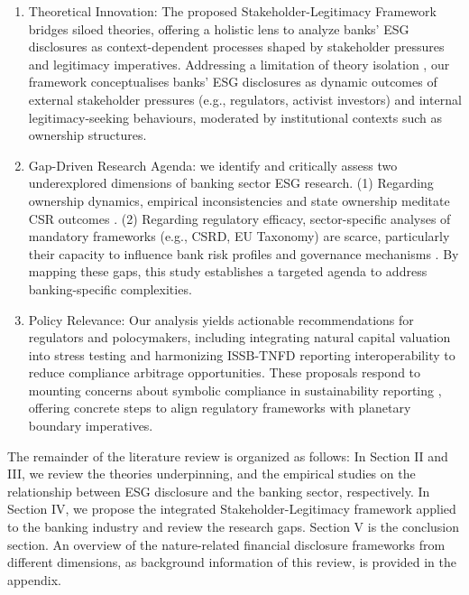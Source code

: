 \documentclass[
  authoryear]{elsarticle}
\begin{document}
\begin{enumerate}
\def\labelenumi{\arabic{enumi}.}
\item
  Theoretical Innovation: The proposed Stakeholder-Legitimacy Framework
  bridges siloed theories, offering a holistic lens to analyze banks'
  ESG disclosures as context-dependent processes shaped by stakeholder
  pressures and legitimacy imperatives. Addressing a limitation of
  theory isolation \citep{ECCLES2012}, our framework conceptualises
  banks' ESG disclosures as dynamic outcomes of external stakeholder
  pressures (e.g., regulators, activist investors) and internal
  legitimacy-seeking behaviours, moderated by institutional contexts
  such as ownership structures.
\item
  Gap-Driven Research Agenda: we identify and critically assess two
  underexplored dimensions of banking sector ESG research. (1) Regarding
  ownership dynamics, empirical inconsistencies and state ownership
  meditate CSR outcomes \citep{DYCK2019, RAIMO2020}. (2) Regarding
  regulatory efficacy, sector-specific analyses of mandatory frameworks
  (e.g., CSRD, EU Taxonomy) are scarce, particularly their capacity to
  influence bank risk profiles and governance mechanisms
  \citep{ESRB2016}. By mapping these gaps, this study establishes a
  targeted agenda to address banking-specific complexities.
\item
  Policy Relevance: Our analysis yields actionable recommendations for
  regulators and polocymakers, including integrating natural capital
  valuation into stress testing and harmonizing ISSB-TNFD reporting
  interoperability to reduce compliance arbitrage opportunities. These
  proposals respond to mounting concerns about symbolic compliance in
  sustainability reporting \citep{SMITH2022}, offering concrete steps to
  align regulatory frameworks with planetary boundary imperatives.
\end{enumerate}

The remainder of the literature review is organized as follows: In
Section II and III, we review the theories underpinning, and the
empirical studies on the relationship between ESG disclosure and the
banking sector, respectively. In Section IV, we propose the integrated
Stakeholder-Legitimacy framework applied to the banking industry and
review the research gaps. Section V is the conclusion section. An
overview of the nature-related financial disclosure frameworks from
different dimensions, as background information of this review, is
provided in the appendix.
\end{document}
